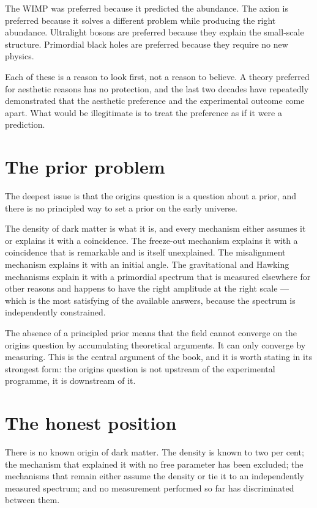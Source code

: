 The WIMP was preferred because it predicted the abundance. The axion is
preferred because it solves a different problem while producing the right
abundance. Ultralight bosons are preferred because they explain the
small-scale structure. Primordial black holes are preferred because they
require no new physics.

Each of these is a reason to look first, not a reason to believe. A theory
preferred for aesthetic reasons has no protection, and the last two decades
have repeatedly demonstrated that the aesthetic preference and the
experimental outcome come apart. What would be illegitimate is to treat the
preference as if it were a prediction.

\section{The prior problem}The deepest issue is that the origins question is a
question about a prior, and there is no principled way to set a prior on the
early universe.

The density of dark matter is what it is, and every mechanism either
assumes it or explains it with a coincidence. The freeze-out mechanism
explains it with a coincidence that is remarkable and is itself unexplained.
The misalignment mechanism explains it with an initial angle. The
gravitational and Hawking mechanisms explain it with a primordial spectrum
that is measured elsewhere for other reasons and happens to have the right
amplitude at the right scale --- which is the most satisfying of the
available answers, because the spectrum is independently constrained.

The absence of a principled prior means that the field cannot converge on the
origins question by accumulating theoretical arguments. It can only converge
by measuring. This is the central argument of the book, and it is worth
stating in its strongest form: the origins question is not upstream of the
experimental programme, it is downstream of it.

\section{The honest position}There is no known origin of dark matter. The density
is known to two per cent; the mechanism that explained it with no free
parameter has been excluded; the mechanisms that remain either assume the
density or tie it to an independently measured spectrum; and no measurement
performed so far has discriminated between them.

